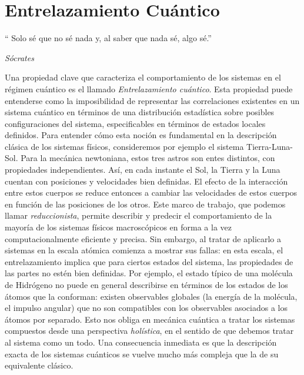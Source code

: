 \chapter{Entrelazamiento Cuántico}

\begin{center}
  \begin{minipage}{0.5\textwidth}
    \begin{small}
      `` Solo sé que no sé nada y, al saber que nada sé, algo sé.'' \par
 \begin{flushright}{\it Sócrates}
 \end{flushright}
    \end{small}
\end{minipage}
  \vspace{0.5cm}
\end{center}

Una propiedad clave que caracteriza el comportamiento de los sistemas en el régimen cuántico es el llamado 
\emph{Entrelazamiento cuántico}. Esta propiedad puede entenderse como la imposibilidad de representar las correlaciones existentes en un sistema
cuántico en términos de una distribución estadística sobre posibles configuraciones del sistema, especificables en términos de estados locales definidos.
Para entender cómo esta noción es fundamental en la descripción clásica de los sistemas físicos, consideremos por ejemplo el sistema Tierra-Luna-Sol.
Para la mecánica newtoniana, estos tres astros son entes distintos, con propiedades independientes. Así, en cada instante el Sol, la Tierra y la Luna 
cuentan con posiciones y velocidades bien definidas. El efecto de la interacción entre estos cuerpos se reduce entonces a cambiar las velocidades de 
estos cuerpos en función de las posiciones de los otros. Este marco de trabajo, que podemos llamar \emph{reduccionista}, permite describir y predecir
el comportamiento de la mayoría de los sistemas físicos macroscópicos en forma a la vez computacionalmente eficiente y precisa. Sin embargo, al tratar
de aplicarlo a sistemas en la escala atómica comienza a mostrar sus fallas: en esta escala, el entrelazamiento implica que para ciertos estados 
del sistema, las propiedades de las partes no estén bien definidas. Por ejemplo, el estado típico de una molécula de Hidrógeno no puede en general 
describirse en términos de los estados de los átomos que la conforman: existen observables globales (la energía de la molécula, el impulso angular) 
que no son  compatibles con los observables asociados a los átomos por separado. Esto nos obliga en mecánica cuántica a tratar los sistemas compuestos 
desde una perspectiva \emph{holística}, en el sentido de que debemos tratar al sistema como un todo. Una consecuencia inmediata es que la descripción exacta 
de los sistemas cuánticos se vuelve mucho más compleja que la de su equivalente clásico.

